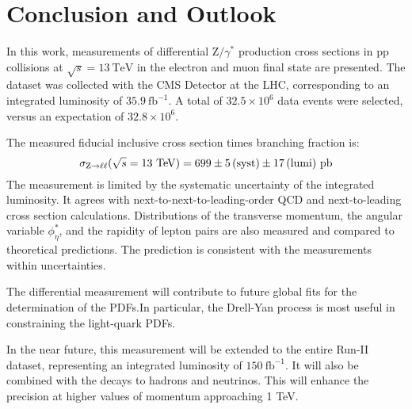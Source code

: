 \chapter{Conclusion and Outlook}

In this work, measurements of differential $\mathrm{Z}/\gamma^{*}$ production cross sections in $\mathrm{p}\mathrm{p}$ collisions at $\sqrt{s}=13~\mathrm{TeV}$ in the electron and muon final state
are presented.
The dataset was collected with the CMS Detector at the LHC, corresponding to an integrated luminosity of $35.9~\mathrm{fb}^{-1}$.
A total of $32.5 \times 10^{6}$ data events were selected, versus an expectation of $32.8 \times 10^{6}$.

The measured fiducial inclusive cross section times branching fraction is: 
\begin{equation*}
\sigma_{\mathrm{Z} \to \ell\ell}(\sqrt{s}=13~\mathrm{TeV}) = 699\pm5\,\text{(syst)}\pm17\,\text{(lumi)}~\mathrm{pb}
\end{equation*}
The measurement is limited by the systematic uncertainty of the integrated luminosity.
It agrees with next-to-next-to-leading-order QCD and next-to-leading cross section calculations. 
Distributions of the transverse momentum, the angular variable $\phi^{*}_\eta$, and the rapidity of lepton pairs are also measured and compared to theoretical predictions.
The prediction is consistent with the measurements within uncertainties.

The differential measurement will contribute to future global fits for the determination of the PDFs.In particular, the Drell-Yan process is most useful in constraining the light-quark PDFs.

In the near future, this measurement will be extended to the entire Run-II dataset,
representing an integrated luminosity of $150~\mathrm{fb}^{-1}$.
It will also be combined with the decays to hadrons and neutrinos.
This will enhance the precision at higher values of momentum approaching 1 TeV.

